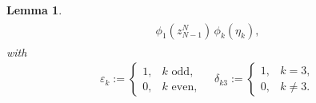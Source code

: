 \documentclass[10pt, a4paper]{amsart}
\theoremstyle{plain}
\newtheorem{lemma}{Lemma}[section]
\theoremstyle{definition}
\theoremstyle{remark}
\numberwithin{equation}{section}
\begin{document}
\begin{lemma}
\begin{align}
\begin{aligned}
{}{\phi_1(z^N_{N-1})}\,\phi_k(\eta_k),
\end{aligned}
\end{align}
with
\begin{align*}
\varepsilon_k :=
\begin{cases}
1, & \text{$k$ odd},\\%
0, & \text{$k$ even},%
\end{cases}
\quad\delta_{k3}:=
\begin{cases}
1,& k=3,\\
0,& k\neq 3.
\end{cases}
\end{align*}

\end{lemma}
\end{document}
